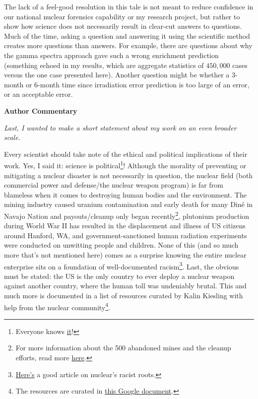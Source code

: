 {The lack of a feel-good resolution in this tale is not meant to reduce
confidence in our national nuclear forensics capability or my research project,
but rather to show how science does not necessarily result in clear-cut answers
to questions. Much of the time, asking a question and answering it using the
scientific method creates more questions than answers. For example,  there are
questions about why the gamma spectra approach gave such a wrong enrichment
prediction (something echoed in my results, which are aggregate statistics of
$450,000$ cases versus the one case presented here). Another question might be
whether a 3-month or 6-month time since irradiation error prediction is too
large of an error, or an acceptable error.

\begin{tcolorbox}[halign=center]
\textbf{Author Commentary}
\end{tcolorbox}

\textit{Last, I wanted to make a short statement about my work on an even
broader scale.}

Every scientist should take note of the ethical and political implications of
their work. Yes, I said it: science is political\footnote[8]{Everyone knows
\href{https://www.scientificamerican.com/article/yes-science-is-political/}{\color{blue}it}!}!
Although the morality of preventing or mitigating a nuclear disaster is not
necessarily in question, the nuclear field (both commercial power and
defense/the nuclear weapon program) is far from blameless when it comes to
destroying human bodies and the environment. The mining industry caused uranium
contamination and early death for many Din\'{e} in Navajo Nation and
payouts/cleanup only began recently\footnote[9]{For more information about the 500
abandoned mines and the cleanup efforts, read more
\href{https://www.epa.gov/navajo-nation-uranium-cleanup/abandoned-mines-cleanup}{\color{blue}here}.},
plutonium production during World War II has resulted in the displacement and
illness of US citizens around Hanford, WA, and government-sanctioned human
radiation experiments were conducted on unwitting people and children. None of
this (and so much more that's not mentioned here) comes as a surprise knowing
the entire nuclear enterprise sits on a foundation of well-documented
racism\footnote[10]{\href{https://thebulletin.org/2020/08/a-call-for-antiracist-action-and-accountability-in-the-us-nuclear-community/}{\color{blue}Here's}
a good article on nuclear's racist roots.}.  Last, the obvious must be stated:
the US is the only country to ever deploy a nuclear weapon against another
country, where the human toll was undeniably brutal. This and much more is
documented in a list of resources curated by Kalin Kiesling with help from the
nuclear community\footnote[11]{The resources are curated in
\href{https://docs.google.com/document/d/e/2PACX-1vQuRSix5J31G4yhH-Z0kwmlpXe6OgS9MXg6l-LBEOVNDPDAPVivPSrJ7A71TMCsW2EdvGMepZCcwdTP/pub}{\color{blue}this
Google document}.}.

}
